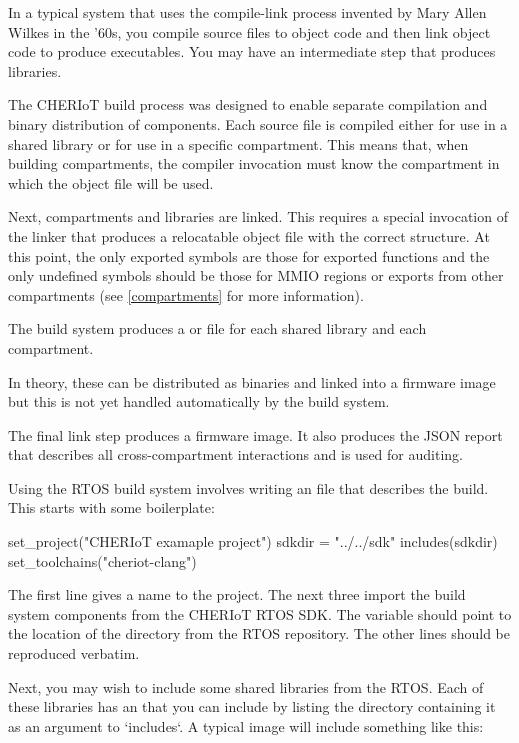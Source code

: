 In a typical system that uses the compile-link process invented by Mary Allen Wilkes in the '60s, you compile source files to object code and then link object code to produce executables.
You may have an intermediate step that produces libraries.

The CHERIoT build process was designed to enable separate compilation and binary distribution of components.
Each source file is compiled either for use in a shared library or for use in a specific compartment.
This means that, when building compartments, the compiler invocation must know the compartment in which the object file will be used.

Next, compartments and libraries are linked.
This requires a special invocation of the linker that produces a relocatable object file with the correct structure.
At this point, the only exported symbols are those for exported functions and the only undefined symbols should be those for MMIO regions or exports from other compartments (see \ref{compartments} for more information).

\begin{note}
	The build system produces a  or  file for each shared library and each compartment.
\end{note}
In theory, these can be distributed as binaries and linked into a firmware image but this is not yet handled automatically by the build system.

The final link step produces a firmware image.
It also produces the JSON report that describes all cross-compartment interactions and is used for auditing.

Using the RTOS build system involves writing an  file that describes the build.
This starts with some boilerplate:

\begin{luasnippet}
set_project("CHERIoT examaple project")
sdkdir = "../../sdk"
includes(sdkdir)
set_toolchains("cheriot-clang")
\end{luasnippet}

The first line gives a name to the project.
The next three import the build system components from the CHERIoT RTOS SDK.
The  variable should point to the location of the  directory from the RTOS repository.
The other lines should be reproduced verbatim.

Next, you may wish to include some shared libraries from the RTOS.
Each of these libraries has an  that you can include by listing the directory containing it as an argument to `includes`.
A typical image will include something like this:

